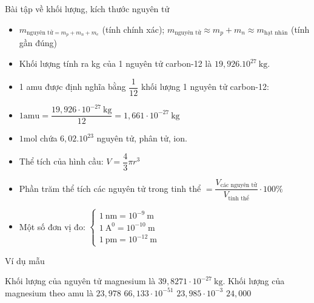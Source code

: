









\newpage
\begin{dangntd}{Bài tập về khối lượng, kích thước nguyên tử}	
	\\
	\begin{itemize}
		\item $ m _{\text{nguyên tử}=m_{p}+m_{n} + m_{e} } $ (tính chính xác); $ m _{\text{nguyên tử}} \approx  m_{p} + m_{n} \approx m_{\text{hạt nhân}} $ (tính gần đúng)
		\item Khối lượng tính ra kg của 1 nguyên tử carbon-12 là $ 19,926 . 10^{27}~\mathrm{kg}$.
		\item 1 amu được định nghĩa bằng $\dfrac{1}{12}$ khối lượng 1 nguyên tử carbon-12:
		\item$1 \mathrm{amu}=\dfrac{19,926 \cdot 10^{-27} \mathrm{~kg}}{12}=1,661 \cdot 10^{-27} \mathrm{~kg}$
		\item$1 \mathrm{mol}$ chứa $ 6,02.10^{23} $ nguyên tử, phân tử, ion.
	\end{itemize}
	\begin{itemize}
		\item Thể tích của hình cầu:
		$ V=\dfrac{4}{3}\pi r^3 $
		\item Phần trăm thể tích các nguyên tử trong tinh thể $ = \dfrac{V_{\text{các nguyên tử}}}{V_{\text{tinh thể}}}\cdot 100\% $
		\item Một số đơn vị đo: 
		$\left\{\begin{array}{l}
			1~\mathrm{nm} = 10^{-9}~\mathrm{m}\\
			1~\mathrm{A^{0}} = 10^{-10}~\mathrm{m}\\
			1~\mathrm{pm} = 10^{-12}~\mathrm{m}	
		\end{array}\right.$
	\end{itemize}
\end{dangntd}
\begin{vdm}{Ví dụ mẫu}
\end{vdm}


\begin{vdex}[2]	
	Khối lượng của nguyên tử magnesium là $39,8271 \cdot 10^{-27} \mathrm{~kg}$. Khối lượng của magnesium theo amu là
	\choice
	{%
		\True $ 23,978 $
	}
	{%
		$66,133 \cdot 10^{-51}$
	}
	{%
		$23,985 \cdot 10^{-3}$
	}
	{%
		$ 24,000 $
	}
	\huongdan{
		
	}	
\end{vdex}


